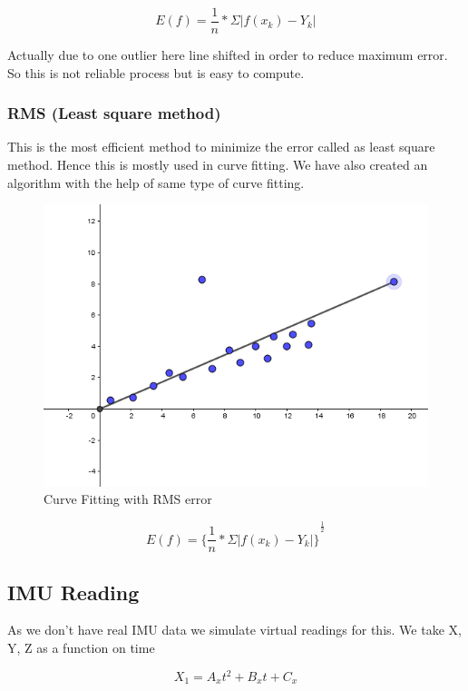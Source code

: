 \begin{equation}
E(f)=\frac{1}{n}*\Sigma|f(x_k)-Y_k| 
\end{equation}

Actually due to one outlier here line shifted in order to reduce maximum error. So this is not reliable process but is easy to compute.

\subsubsection{RMS (Least square method)}
This is the most efficient method to minimize the error called as least square method.
Hence this is mostly used in curve fitting.
We have also created an algorithm with the help of same type of curve fitting.

\begin{figure}[!htb]
\includegraphics[width=\textwidth]{./figures/RMS.PNG}
\caption{Curve Fitting with RMS error }
\end{figure}

\begin{equation}
E(f)={\lbrace\frac{1}{n}*\Sigma|f(x_k)-Y_k|\rbrace}^\frac{1}{2} 
\end{equation}

\subsection{IMU Reading}
As we don’t have real IMU data we simulate virtual readings for this. We take X, Y, Z as a function on time 

\begin{equation}
\label{For_x}
X_1=A_x t^2+B_x t +C_x
\end{equation}

